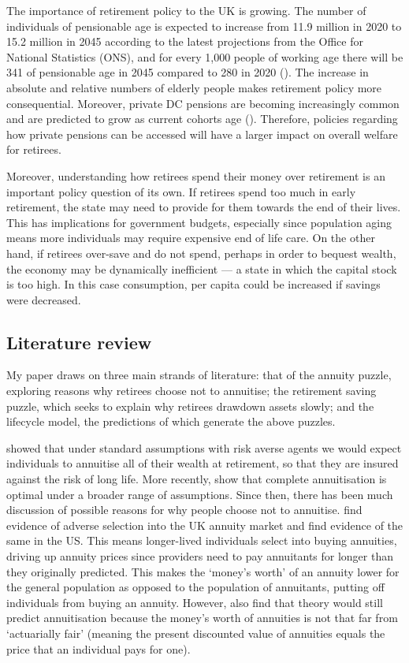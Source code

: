 \documentclass[12pt]{article}
\begin{document}
The importance of retirement policy to the UK is growing. The
number of individuals of pensionable age is expected to increase from 11.9
million in 2020 to 15.2 million in 2045 according to the latest projections from
the Office for National Statistics (ONS), and for every 1,000 people of working
age there will be 341 of pensionable age in 2045 compared to 280 in 2020
(\cite{ons-population-predictions-2020}). The increase in absolute and relative
numbers of elderly people makes retirement policy more consequential. Moreover,
private DC pensions are becoming increasingly common and are predicted to grow
as current cohorts age (\cite{cribb-karjalainen-ifs-2023}). Therefore, policies
regarding how private pensions can be accessed will have a larger impact on
overall welfare for retirees.

Moreover, understanding how retirees spend their money over retirement is an
important policy question of its own. If retirees spend too much in early
retirement, the state may need to provide for them towards the end of their
lives. This has implications for government budgets, especially since population
aging means more individuals may require expensive end of life care. On the
other hand, if retirees over-save and do not spend, perhaps in order to bequest
wealth, the economy may be dynamically inefficient --- a state in which the
capital stock is too high. In this case consumption, per capita could be
increased if savings were decreased.


\subsection{Literature review}
My paper draws on three main strands of literature: that of the annuity puzzle,
exploring reasons why retirees choose not to annuitise; the retirement
saving puzzle, which seeks to explain why retirees drawdown assets slowly; and
the lifecycle model, the predictions of which generate the above puzzles.

\cite{yaari-65} showed that under standard assumptions with risk averse agents
we would expect individuals to annuitise all of their wealth at retirement, so
that they are insured against the risk of long life. More recently,
\cite{davidoff-brown-diamond-aer-2005} show that complete annuitisation is
optimal under a broader range of assumptions. Since then, there has been much
discussion of possible reasons for why people choose not to annuitise.
\cite{finkelstein-porteba-2002, finkelstein-porteba-2004} find evidence of
adverse selection into the UK annuity market and \cite{mitchell-et-al-1999} find
evidence of the same in the US. This means longer-lived individuals select into
buying annuities, driving up annuity prices since providers need to pay
annuitants for longer than they originally predicted. This
makes the `money's worth' of an annuity lower for the general population as
opposed to the population of annuitants, putting off individuals from buying an
annuity. However, \cite{mitchell-et-al-1999} also find that theory would still
predict annuitisation because the money's worth of annuities is not that far
from `actuarially fair' (meaning the present discounted value of annuities
equals the price that an individual pays for one).
\end{document}
